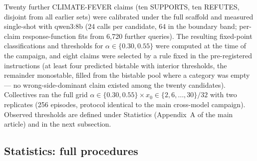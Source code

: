 \documentclass[11pt]{article}
\begin{document}
Twenty further CLIMATE-FEVER claims (ten SUPPORTS, ten REFUTES, disjoint from
all earlier sets) were calibrated under the full scaffold and measured
single-shot with qwen3:8b (24 calls per candidate, 64 in the boundary band;
per-claim response-function fits from 6{,}720 further queries). The resulting
fixed-point classifications and thresholds for $\alpha \in \{0.30, 0.55\}$
were computed at the time of the campaign, and eight claims were selected by
a rule fixed in the pre-registered instructions (at least four predicted bistable with interior
thresholds, the remainder monostable, filled from the bistable pool where a
category was empty --- no wrong-side-dominant claim existed among the twenty
candidates). Collectives ran the full grid $\alpha \in \{0.30, 0.55\} \times
x_0 \in \{2, 6, \ldots, 30\}/32$ with two replicates (256 episodes, protocol
identical to the main cross-model campaign). Observed thresholds are defined
under Statistics (Appendix~A of the main article) and in the next subsection.

\subsection{Statistics: full procedures}
\end{document}
